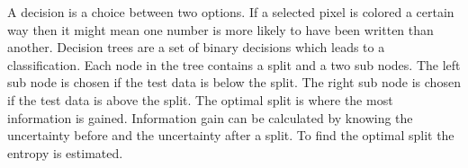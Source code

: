 A decision is a choice between two options.
If a selected pixel is colored a certain way then it might mean one number is more likely to have been written than another.
Decision trees are a set of binary decisions which leads to a classification.
Each node in the tree contains a split and a two sub nodes.
The left sub node is chosen if the test data is below the split. 
The right sub node is chosen if the test data is above the split.
The optimal split is where the most information is gained.
Information gain can be calculated by knowing the uncertainty before and the uncertainty after a split.
To find the optimal split the entropy is estimated.

